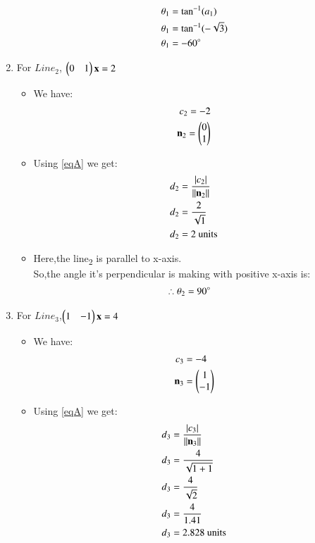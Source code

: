 \documentclass[journal,12pt,twocolumn]{IEEEtran}
\begin{document}
\begin{enumerate}
\begin{itemize}
\begin{align}
    \theta\textsubscript{1} &= \tan^{-1}(  a\textsubscript{1})
    \\
    \theta\textsubscript{1} &=\tan^{-1}(-\sqrt{3})
    \\
 \theta\textsubscript{1} &= -60\degree
\end{align}
\end{itemize}
\item For $Line_2$, $\begin{pmatrix}0&1\end{pmatrix}\mathbf{x} =2$
\begin{itemize}
\item We have:
\begin{align}
 c\textsubscript{2}=-2 
 \\
 {\mathbf{n\textsubscript{2}}}=\begin{pmatrix}0\\1\end{pmatrix}  
\end{align}
\item Using \eqref{eqA} we get:
\begin{align}
d\textsubscript{2}&=\frac { \left| c\textsubscript{2} \right| }{\lVert\mathbf{n\textsubscript{2}}\rVert}
\\
d\textsubscript{2}&=\frac{2}{\sqrt{1}} 
\\
d\textsubscript{2}&=2 \text{ units}
\end{align}
\item Here,the line\textsubscript{2} is parallel to x-axis.
\\
So,the angle it's perpendicular is making with positive x-axis is:
\begin{align}
\therefore \theta\textsubscript{2} &= 90\degree
\end{align}
\end{itemize}
\item For $Line_3$,$\begin{pmatrix}1&-1\end{pmatrix}\mathbf{x} =4$
\begin{itemize}
\item We have:
\begin{align}
 c\textsubscript{3}&= -4 
 \\
 {\mathbf{n\textsubscript{3}}}&=\begin{pmatrix}1\\-1\end{pmatrix}   \label{eq4}
\end{align}
\item Using \eqref{eqA} we get:
\begin{align}
d\textsubscript{3}&=\frac { \left| c\textsubscript{3}\right| }{\lVert\mathbf{n\textsubscript{3}}\rVert}
\\
d\textsubscript{3}&=\frac{4}{\sqrt{1+1}} 
\\
d\textsubscript{3}&=\frac{4}{\sqrt{2}}
\\
d\textsubscript{3}&=\frac{4}{1.41}
\\
d\textsubscript{3}&=2.828 \text{ units}
\end{align}


\end{itemize}
\end{enumerate}
\end{document}
